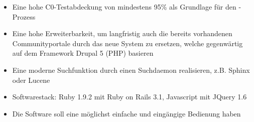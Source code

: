 \begin{itemize}
 \item Eine hohe C0-Testabdeckung von mindestens 95\% als Grundlage für den -Prozess
 \item Eine hohe Erweiterbarkeit, um langfristig auch die bereits vorhandenen Communityportale durch das neue System zu ersetzen, welche gegenwärtig auf dem Framework Drupal 5 (PHP) basieren
 \item Eine moderne Suchfunktion durch einen Suchdaemon realisieren, z.B. Sphinx oder Lucene
 \item Softwarestack: Ruby 1.9.2 mit Ruby on Rails 3.1, Javascript mit JQuery 1.6
 \item Die Software soll eine möglichst einfache und eingängige Bedienung haben
\end{itemize}

